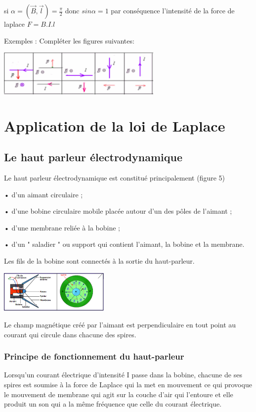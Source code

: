 \documentclass[12pt]{article}
\begin{document}
  si $\alpha = (\vec{B}, \vec{l}) = \frac{\pi}{2}$ donc $sin\alpha =  1$ par conséquence l'intensité de la force de laplace $F = B.I.l$

  Exemples : Compléter les figures suivantes:
   \begin{center}
    \includegraphics[width=0.6\textwidth]{./img/Exemple_appl.png}
  \end{center}

  \section{Application de la loi de Laplace }
  \subsection{Le haut parleur électrodynamique }
 
Le haut parleur électrodynamique est constitué principalement (figure 5)

• d’un aimant circulaire ;

• d’une bobine circulaire mobile placée autour d’un des pôles de l’aimant ;

• d’une membrane reliée à la bobine ;

• d’un " saladier " ou support qui contient l’aimant, la bobine et la membrane.

Les fils de la bobine sont connectés à la sortie du haut-parleur.
   \begin{center}
    \includegraphics[width=0.4\textwidth]{./img/haut parleur.png}
  \end{center}
Le champ magnétique créé par l’aimant est perpendiculaire en tout point au courant qui circule dans chacune
des spires.
\subsubsection{Principe de fonctionnement du haut-parleur }

Lorsqu'un courant électrique d'intensité I passe dans la bobine, chacune de ses spires est soumise à la force de Laplace qui la met en mouvement ce qui provoque le mouvement de membrane qui agit sur la couche d'air qui
l'entoure et elle produit un son qui a la même fréquence que celle du courant électrique.
\end{document}
